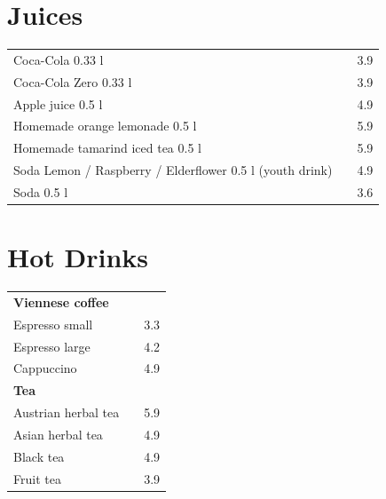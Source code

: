 \documentclass[a4paper,12pt]{article}
\begin{document}
\small
\titlespacing*{\section}{0pt}{0.45em}{0.25em}
\setlength{\columnsep}{0.7cm}
\begin{multicols}{2}

\section*{Juices}
\begin{tabular}{Lrr}
Coca-Cola 0.33 l & & 3.9\\
Coca-Cola Zero 0.33 l & & 3.9\\
Apple juice 0.5 l & & 4.9\\
Homemade orange lemonade 0.5 l & & 5.9\\
Homemade tamarind iced tea 0.5 l & & 5.9\\
Soda Lemon / Raspberry / Elderflower 0.5 l (youth drink) & & 4.9\\
Soda 0.5 l & & 3.6
\end{tabular}

\section*{Hot Drinks}
\begin{tabular}{Lrr}
\textbf{Viennese coffee}\\
\hspace{0.4cm}Espresso small & & 3.3\\
\hspace{0.4cm}Espresso large & & 4.2\\
\hspace{0.4cm}Cappuccino & & 4.9\vspace{0.1cm}\\
\textbf{Tea}\\
\hspace{0.4cm}Austrian herbal tea & & 5.9\\
\hspace{0.4cm}Asian herbal tea & & 4.9\\
\hspace{0.4cm}Black tea & & 4.9\\
\hspace{0.4cm}Fruit tea & & 3.9
\end{tabular}


\end{multicols}
\end{document}
